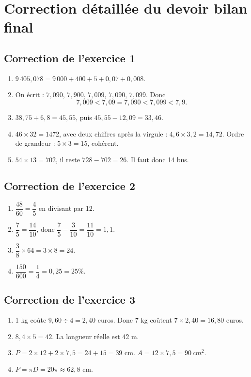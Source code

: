 \documentclass[11pt,a4paper]{article}
\begin{document}
\newpage
\section{Correction détaillée du devoir bilan final}

\subsection*{Correction de l'exercice 1}
\begin{enumerate}[label=\arabic*)]
\item \(9\,405,078=9\,000+400+5+0,07+0,008\).
\item On écrit : \(7,090\), \(7,900\), \(7,009\), \(7,090\), \(7,099\). Donc
\[
7,009<7,09=7,090<7,099<7,9.
\]
\item \(38,75+6,8=45,55\), puis \(45,55-12,09=33,46\).
\item \(46\times32=1472\), avec deux chiffres après la virgule : \(4,6\times3,2=14,72\). Ordre de grandeur : \(5\times3=15\), cohérent.
\item \(54\times13=702\), il reste \(728-702=26\). Il faut donc 14 bus.
\end{enumerate}

\subsection*{Correction de l'exercice 2}
\begin{enumerate}[label=\arabic*)]
\item \(\dfrac{48}{60}=\dfrac{4}{5}\) en divisant par 12.
\item \(\dfrac75=\dfrac{14}{10}\), donc \(\dfrac75-\dfrac3{10}=\dfrac{11}{10}=1,1\).
\item \(\dfrac38\times64=3\times8=24\).
\item \(\dfrac{150}{600}=\dfrac14=0,25=25\%\).
\end{enumerate}

\subsection*{Correction de l'exercice 3}
\begin{enumerate}[label=\arabic*)]
\item 1 kg coûte \(9,60\div4=2,40\) euros. Donc 7 kg coûtent \(7\times2,40=16,80\) euros.
\item \(8,4\times5=42\). La longueur réelle est 42 m.
\item \(P=2\times12+2\times7,5=24+15=39\) cm. \(A=12\times7,5=90\,cm^2\).
\item \(P=\pi D=20\pi\approx62,8\) cm.
\end{enumerate}
\end{document}

